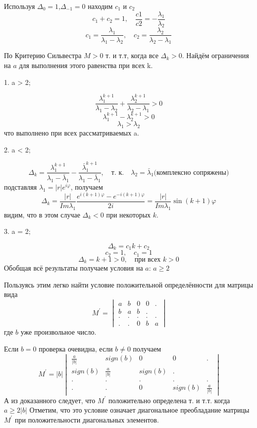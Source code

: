 \documentclass[12pt,a4paper]{article}
\renewcommand{\geq}{\geqslant}
\begin{document}
Используя $ \Delta_0 = 1$,\quad$ \Delta_{-1} = 0 $ находим $c_1$ и $c_2$
$$c_1+c_2 = 1, \quad \frac{c1}{c2}= -\frac{\lambda_1}{\lambda_2}$$
 $$c_1 =\frac{\lambda_1}{\lambda_1-\lambda_2},  \quad c_2 = \frac{\lambda_2}{\lambda_2-\lambda_1}$$
 
По Критерию Сильвестра $M > 0$ т. и т.т, когда все  $\Delta_k > 0$.
Найдём ограничения на $a$ для выполнения этого равенства при всех k.

\begin{flushleft}
1. a > 2;
\end{flushleft}
$$
\frac{\lambda_1^{k+1}}{\lambda_1-\lambda_2} + \frac{\lambda_2^{k+1}}{\lambda_2-\lambda_1} > 0$$
$$\lambda_1^{k+1} - \lambda_2^{k+1}>0$$
$$\lambda_1>\lambda_2$$
что выполнено при всех рассматриваемых a.

\begin{flushleft}
2. a < 2;
\end{flushleft}
$$\Delta_k = \frac{\lambda_1^{k+1}}{\lambda_1-\bar{\lambda}_1} - \frac{\bar{\lambda}_1^{k+1}}{\lambda_1-\bar{\lambda}_1}, \quad \text{т. к.}\quad\lambda_2 = \bar{\lambda}_1\text{(комплексно сопряжены)}$$
подставляя $\lambda_1 = |r|e^{i\varphi}$, получаем 
$$\Delta_k = \frac{|r|}{Im\lambda_1}\frac{e^{i(k+1)\varphi} - e^{-i(k+1)\varphi}}{2i} = \frac{|r|}{Im\lambda_1}\sin{(k+1)\varphi}$$
видим, что в этом случае $\Delta_k < 0$ при некоторых $k$.

\begin{flushleft}
3. a = 2;
\end{flushleft}
$$\Delta_k = c_1 k + c_2$$
$$c_2 = 1,\quad c_1 = 1 $$
$$\Delta_k = k + 1 > 0, \quad \text{при всех } k > 0$$
Обобщая всё результаты получаем условия на $a$: $a\geq2$

Пользуясь этим легко найти условие положительной определённости для матрицы вида $$\ M^{'}  = \begin{vmatrix}
a &  b & 0 & 0&.\\
b & a & b & .\\
.&.&.&.&.\\
.&.&0& b &a 
\end{vmatrix}$$
где $b$ уже произвольное число.

Если $b = 0$ проверка очевидна, если $b\neq0$ получаем
$$\ M^{'}  = |b|\begin{vmatrix}
\frac{a}{|b|} &  sign(b) & 0 & 0&.\\
sign(b) & \frac{a}{|b|} & sign(b) & .\\
.&.&.&.&.\\
.&.&0& sign(b) &\frac{a}{|b|} 
\end{vmatrix}$$
А из доказанного следует, что $M^{'}$ положительно определена т. и т.т. когда $a\geq2|b|$
Отметим, что это условие означает диагональное преобладание матрицы $M^{'}$ при положительности диагональных элементов.
\end{document}
